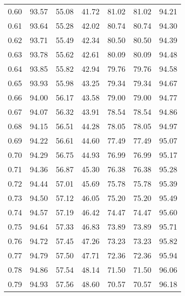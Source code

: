 \begin{tabular}{|c|c|c|c|c|c|c|}
      0.60 &     93.57 &     55.08 &      41.72 &   81.02 &      81.02 &         94.21 \\
      0.61 &     93.64 &     55.28 &      42.02 &   80.74 &      80.74 &         94.30 \\
      0.62 &     93.71 &     55.49 &      42.34 &   80.50 &      80.50 &         94.39 \\
      0.63 &     93.78 &     55.62 &      42.61 &   80.09 &      80.09 &         94.48 \\
      0.64 &     93.85 &     55.82 &      42.94 &   79.76 &      79.76 &         94.58 \\
      0.65 &     93.93 &     55.98 &      43.25 &   79.34 &      79.34 &         94.67 \\
      0.66 &     94.00 &     56.17 &      43.58 &   79.00 &      79.00 &         94.77 \\
      0.67 &     94.07 &     56.32 &      43.91 &   78.54 &      78.54 &         94.86 \\
      0.68 &     94.15 &     56.51 &      44.28 &   78.05 &      78.05 &         94.97 \\
      0.69 &     94.22 &     56.61 &      44.60 &   77.49 &      77.49 &         95.07 \\
      0.70 &     94.29 &     56.75 &      44.93 &   76.99 &      76.99 &         95.17 \\
      0.71 &     94.36 &     56.87 &      45.30 &   76.38 &      76.38 &         95.28 \\
      0.72 &     94.44 &     57.01 &      45.69 &   75.78 &      75.78 &         95.39 \\
      0.73 &     94.50 &     57.12 &      46.05 &   75.20 &      75.20 &         95.49 \\
      0.74 &     94.57 &     57.19 &      46.42 &   74.47 &      74.47 &         95.60 \\
      0.75 &     94.64 &     57.33 &      46.83 &   73.89 &      73.89 &         95.71 \\
      0.76 &     94.72 &     57.45 &      47.26 &   73.23 &      73.23 &         95.82 \\
      0.77 &     94.79 &     57.50 &      47.71 &   72.36 &      72.36 &         95.94 \\
      0.78 &     94.86 &     57.54 &      48.14 &   71.50 &      71.50 &         96.06 \\
      0.79 &     94.93 &     57.56 &      48.60 &   70.57 &      70.57 &         96.18 \\

\end{tabular}

